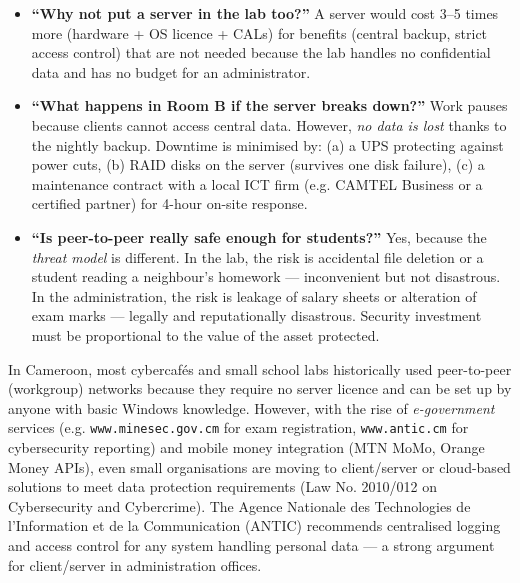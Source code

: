 \documentclass[11pt]{article}
\newcommand{\cle}[1]{{\popxbold\color{popdark}#1}}
\begin{document}
\begin{exemplebox}
\begin{itemize}
\item \textbf{``Why not put a server in the lab too?''} A server would cost 3--5 times more (hardware + OS licence + CALs) for benefits (central backup, strict access control) that are not needed because the lab handles no confidential data and has no budget for an administrator.
\item \textbf{``What happens in Room B if the server breaks down?''} Work pauses because clients cannot access central data. However, \emph{no data is lost} thanks to the nightly backup. Downtime is minimised by: (a) a UPS protecting against power cuts, (b) RAID disks on the server (survives one disk failure), (c) a maintenance contract with a local ICT firm (e.g. CAMTEL Business or a certified partner) for 4-hour on-site response.
\item \textbf{``Is peer-to-peer really safe enough for students?''} Yes, because the \emph{threat model} is different. In the lab, the risk is accidental file deletion or a student reading a neighbour's homework --- inconvenient but not disastrous. In the administration, the risk is leakage of salary sheets or alteration of exam marks --- legally and reputationally disastrous. Security investment must be proportional to the value of the asset protected.
\end{itemize}
\end{exemplebox}

\begin{savaistu}
In Cameroon, most cybercaf\'es and small school labs historically used peer-to-peer (workgroup) networks because they require no server licence and can be set up by anyone with basic Windows knowledge. However, with the rise of \emph{e-government} services (e.g. \texttt{www.minesec.gov.cm} for exam registration, \texttt{www.antic.cm} for cybersecurity reporting) and mobile money integration (MTN MoMo, Orange Money APIs), even small organisations are moving to client/server or cloud-based solutions to meet data protection requirements (Law No. 2010/012 on Cybersecurity and Cybercrime). The \cle{Agence Nationale des Technologies de l'Information et de la Communication (ANTIC)} recommends centralised logging and access control for any system handling personal data --- a strong argument for client/server in administration offices.
\end{savaistu}
\end{document}
